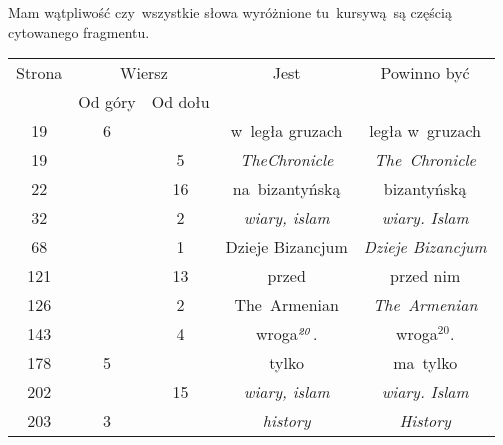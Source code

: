 \documentclass[a4paper,11pt]{article}
\begin{document}
\noindent
{} Mam wątpliwość czy~wszystkie słowa wyróżnione tu~kursywą~są
częścią cytowanego fragmentu.

\vspace{\spaceFour}







\begin{center}

  \begin{tabular}{|c|c|c|c|c|}
    \hline
    Strona & \multicolumn{2}{c|}{Wiersz} & Jest
                              & Powinno być \\ \cline{2-3}
    & Od góry & Od dołu & & \\
    \hline
    \hphantom{0}19 & \hphantom{0}6 & & w~legła gruzach & legła w~gruzach \\
    \hphantom{0}19 & & \hphantom{0}5 & \textit{TheChronicle}
    & \textit{The~Chronicle} \\
    \hphantom{0}22 & & 16 & na~bizantyńską & bizantyńską \\
    \hphantom{0}32 & & \hphantom{0}2 & \textit{wiary, islam}
    & \textit{wiary. Islam} \\
    \hphantom{0}68 & & \hphantom{0}1 & Dzieje Bizancjum
    & \textit{Dzieje Bizancjum} \\
    121 & & 13 & przed & przed nim \\
    126 & & \hphantom{0}2 & The~Armenian & \textit{The~Armenian} \\
    143 & & \hphantom{0}4 & wroga$^{ \textrm{\textit{20}} }$.
    & wroga$^{ 20 }$. \\
    178 & \hphantom{0}5 & & tylko & ma~tylko \\
    202 & & 15 & \textit{wiary, islam} & \textit{wiary. Islam} \\
    203 & \hphantom{0}3 & & \textit{history} & \textit{History} \\
    \hline
  \end{tabular}

\end{center}

\vspace{\spaceTwo}


\end{document}
